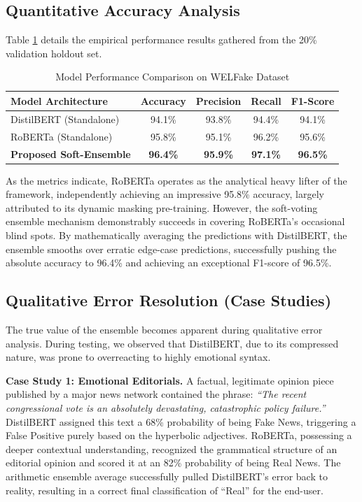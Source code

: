 \documentclass[conference]{IEEEtran}
\begin{document}
\subsection{Quantitative Accuracy Analysis}
Table \ref{tab:performance} details the empirical performance results gathered from the 20\% validation holdout set.

\begin{table}[h]
\centering
\caption{Model Performance Comparison on WELFake Dataset}
\begin{tabular}{|l|c|c|c|c|}
\hline
\textbf{Model Architecture} & \textbf{Accuracy} & \textbf{Precision} & \textbf{Recall} & \textbf{F1-Score} \\
\hline
DistilBERT (Standalone) & 94.1\% & 93.8\% & 94.4\% & 94.1\% \\
RoBERTa (Standalone)    & 95.8\% & 95.1\% & 96.2\% & 95.6\% \\
\hline
\textbf{Proposed Soft-Ensemble} & \textbf{96.4\%} & \textbf{95.9\%} & \textbf{97.1\%} & \textbf{96.5\%} \\
\hline
\end{tabular}
\label{tab:performance}
\end{table}

As the metrics indicate, RoBERTa operates as the analytical heavy lifter of the framework, independently achieving an impressive 95.8\% accuracy, largely attributed to its dynamic masking pre-training. However, the soft-voting ensemble mechanism demonstrably succeeds in covering RoBERTa's occasional blind spots. By mathematically averaging the predictions with DistilBERT, the ensemble smooths over erratic edge-case predictions, successfully pushing the absolute accuracy to 96.4\% and achieving an exceptional F1-score of 96.5\%.

\subsection{Qualitative Error Resolution (Case Studies)}
The true value of the ensemble becomes apparent during qualitative error analysis. During testing, we observed that DistilBERT, due to its compressed nature, was prone to overreacting to highly emotional syntax. 

\textbf{Case Study 1: Emotional Editorials.} A factual, legitimate opinion piece published by a major news network contained the phrase: \textit{``The recent congressional vote is an absolutely devastating, catastrophic policy failure.''} DistilBERT assigned this text a 68\% probability of being Fake News, triggering a False Positive purely based on the hyperbolic adjectives. RoBERTa, possessing a deeper contextual understanding, recognized the grammatical structure of an editorial opinion and scored it at an 82\% probability of being Real News. The arithmetic ensemble average successfully pulled DistilBERT's error back to reality, resulting in a correct final classification of ``Real'' for the end-user.
\end{document}
